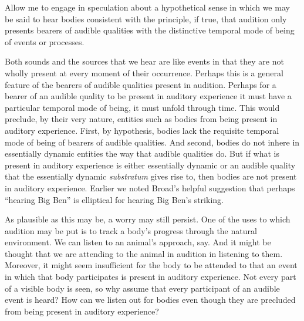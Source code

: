\documentclass[12pt]{article}
\begin{document}

Allow me to engage in speculation about a hypothetical sense in which we may be said to hear bodies consistent with the principle, if true, that audition only presents bearers of audible qualities with the distinctive temporal mode of being of events or processes.

Both sounds and the sources that we hear are like events in that they are not wholly present at every moment of their occurrence. Perhaps this is a general feature of the bearers of audible qualities present in audition. Perhaps for a bearer of an audible quality to be present in auditory experience it must have a particular temporal mode of being, it must unfold through time. This would preclude, by their very nature, entities such as bodies from being present in auditory experience. First, by hypothesis, bodies lack the requisite temporal mode of being of bearers of audible qualities. And second, bodies do not inhere in essentially dynamic entities the way that audible qualities do. But if what is present in auditory experience is either essentially dynamic or an audible quality that the essentially dynamic \emph{substratum} gives rise to, then bodies are not present in auditory experience. Earlier we noted Broad’s helpful suggestion that perhaps “hearing Big Ben” is elliptical for hearing Big Ben’s striking.

As plausible as this may be, a worry may still persist. One of the uses to which audition may be put is to track a body’s progress through the natural environment. We can listen to an animal’s approach, say. And it might be thought that we are attending to the animal in audition in listening to them. Moreover, it might seem insufficient for the body to be attended to that an event in which that body participates is present in auditory experience. Not every part of a visible body is seen, so why assume that every participant of an audible event is heard? How can we listen out for bodies even though they are precluded from being present in auditory experience?
\end{document}
